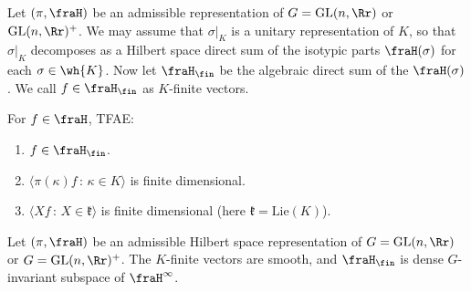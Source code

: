 \begin{definition}
Let $(\pi, \fraH)$ be an admissible representation of $G = \GL(n, \Rr)$ or $\GL(n, \Rr)^{+}$. 
We may assume that $\sigma|_{K}$ is a unitary representation of $K$, so that $\sigma|_{K}$ decomposes as a Hilbert space direct sum of the isotypic parts $\fraH(\sigma)$ for each $\sigma\in \wh{K}$. 
Now let $\fraH_{\fin}$ be the algebraic direct sum of the $\fraH(\sigma)$. 
We call $f\in \fraH_{\fin}$ as $K$-finite vectors. 
\end{definition}

\begin{proposition}
For $f\in \fraH$, TFAE:
\begin{enumerate}
\item $f\in \fraH_{\fin}$.
\item $\langle \pi(\kappa)f\,:\, \kappa\in K\rangle$ is finite dimensional.
\item $\langle Xf\,:\, X\in \mathfrak{k}\rangle$ is finite dimensional (here $\mathfrak{k} = \mathrm{Lie}(K)$). 
\end{enumerate}
\end{proposition}
\begin{proposition}
Let $(\pi, \fraH)$ be an admissible Hilbert space representation of $G = \GL(n, \Rr)$ or $G = \GL(n, \Rr)^{+}$. 
The $K$-finite vectors are smooth, and $\fraH_{\fin}$ is dense $G$-invariant subspace of $\fraH^{\infty}$.
\end{proposition}
